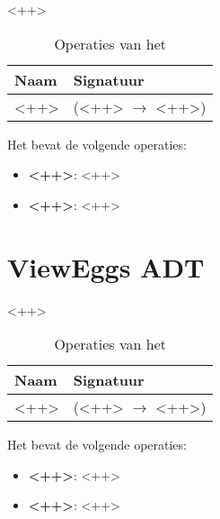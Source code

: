 <++>

\begin{table}[hbt]
\centering
\begin{tabular}{|ll|}
\hline
\rowcolor[HTML]{000000} 
{\color[HTML]{FFFFFF} \textbf{Naam}} & {\color[HTML]{FFFFFF} \textbf{Signatuur}} \\ \hline
<++>                                 & (<++> $\rightarrow$ <++>)                                       \\ \hline
\end{tabular}
\caption{Operaties van het \texttt{}}
\label{table:eggs}
\end{table}

Het \texttt{} bevat de volgende operaties:

\begin{itemize}
	\item \textbf{<++>}: <++>
	\item \textbf{<++>}: <++>
\end{itemize}

\section{View\textunderscore Eggs ADT}
\label{section:view_eggs}

<++>

\begin{table}[hbt]
\centering
\begin{tabular}{|ll|}
\hline
\rowcolor[HTML]{000000} 
{\color[HTML]{FFFFFF} \textbf{Naam}} & {\color[HTML]{FFFFFF} \textbf{Signatuur}} \\ \hline
<++>                                 & (<++> $\rightarrow$ <++>)                                       \\ \hline
\end{tabular}
\caption{Operaties van het \texttt{}}
\label{table:view_eggs}
\end{table}

Het \texttt{} bevat de volgende operaties:

\begin{itemize}
	\item \textbf{<++>}: <++>
	\item \textbf{<++>}: <++>
\end{itemize}

